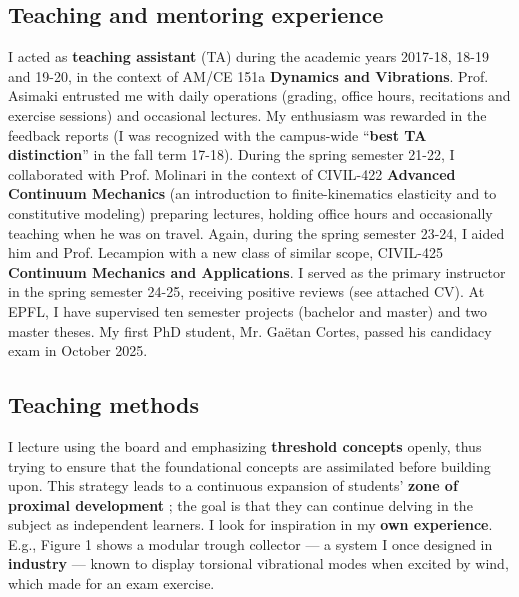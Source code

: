 \documentclass[11pt]{amsart}
\begin{document}
\subsection*{Teaching and mentoring experience} I acted as \textbf{teaching assistant} (TA) during the academic years 2017-18, 18-19 and 19-20, in the context of AM/CE 151a \textbf{Dynamics and Vibrations}.
Prof. Asimaki entrusted me with daily operations (grading, office hours, recitations and exercise sessions) 
and occasional lectures. 
%
My enthusiasm was rewarded in the feedback reports (I was recognized with the campus-wide ``\textbf{best TA distinction}'' in the fall term 17-18). 
%
During the spring semester 21-22, I collaborated with Prof. Molinari in the context of CIVIL-422 \textbf{Advanced Continuum Mechanics} (an introduction to finite-kinematics elasticity and to constitutive modeling) preparing lectures, holding office hours and occasionally teaching when he was on travel. 
%
Again, during the spring semester 23-24, I aided him and Prof. Lecampion with a new class of similar scope, CIVIL-425 \textbf{Continuum Mechanics and Applications}. 
% 
I served as the primary instructor in the spring semester 24-25, receiving positive reviews (see attached CV). 
%
At EPFL, I have supervised ten semester projects (bachelor and master) and two master theses. 
%
My first PhD student, Mr. Gaëtan Cortes, passed his candidacy exam in October 2025. 

\vspace{-0.1cm}

\subsection*{Teaching methods} 
%
I lecture using the board and emphasizing \textbf{threshold concepts} \cite{threshold} openly, thus trying to ensure that the foundational concepts are assimilated before building upon.  
%
%
This strategy leads to 
a continuous expansion of students’ \textbf{zone of proximal development} \cite{PD}; the goal is that they can continue delving in the subject as independent learners.  
%
%
I look for inspiration in my \textbf{own experience}. 
%
E.g., 
Figure 1 shows a modular trough collector — a system I once designed in \textbf{industry} — known to display torsional vibrational modes when excited by wind, which made for an exam exercise. 
\end{document}
